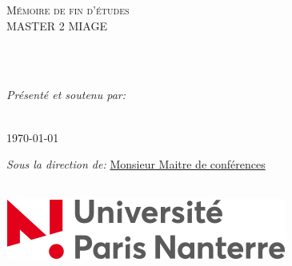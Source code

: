 \documentclass[
12pt, %
french, %
singlespacing, %
headsepline, %
]{MastersDoctoralThesis} %
\author{Valentin \textsc{Bouquet}} %
\begin{document}

\frontmatter %

\pagestyle{plain} %


\begin{titlepage}
\begin{center}

\vspace*{.06\textheight}
{\scshape\LARGE \univname \par}\vspace{1.5cm} %
\textsc{\Large Mémoire de fin d'études\\[0.5cm] MASTER 2 MIAGE}\\[0.5cm] %

\HRule \\[0.4cm] %
{\huge \bfseries \ttitle\par}\vspace{0.4cm} %
\HRule \\[1.5cm] %

\begin{minipage}[t]{1\textwidth}
\begin{center}
\emph{\large Présenté et soutenu par:}\\[0.3cm]
\href{http://www.github.com/vbouquet}{\LARGE \authorname} %
\end{center}
\end{minipage}\\[1cm]

{\large \today}\\[1cm] %

\begin{minipage}[t]{1\textwidth}
\begin{center}
\emph{Sous la direction de:} \href{https://www.lip6.fr/actualite/personnes-fiche.php?ident=P216}{Monsieur \supname  Maitre de conférences} %
\end{center}
\end{minipage}\\[2cm]

\includegraphics[scale=0.75]{figures/logo-paris-nanterre.jpg} %
 
\vfill
\end{center}
\end{titlepage}
\end{document}
